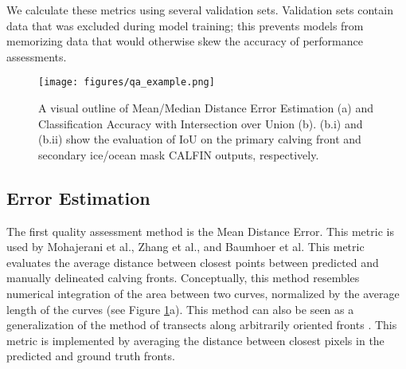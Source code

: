 \documentclass[tc, manuscript]{copernicus}
\begin{document}
We calculate these metrics using several validation sets. Validation sets contain data that was excluded during model training; this prevents models from memorizing data that would otherwise skew the accuracy of performance assessments.

\setlength{\intextsep}{4.0pt plus 2.0pt minus 2.0pt}


\begin{figure}[h]
    \texttt{[image: figures/qa\_example.png]}
    \centering
    \caption{A visual outline of Mean/Median Distance Error Estimation (a) and Classification Accuracy with Intersection over Union (b). (b.i) and (b.ii) show the evaluation of IoU on the primary calving front and secondary ice/ocean mask CALFIN outputs, respectively.}
    \label{fig:error_analysis}
\end{figure}

\subsection{Error Estimation}
\label{sec:error_estimation}
The first quality assessment method is the Mean Distance Error. This metric is used by Mohajerani et al., Zhang et al., and Baumhoer et al. This metric evaluates the average distance between closest points between predicted and manually delineated calving fronts. Conceptually, this method resembles numerical integration of the area between two curves, normalized by the average length of the curves (see Figure \ref{fig:error_analysis}a). This method can also be seen as a generalization of the method of transects along arbitrarily oriented fronts \citep{mohajerani2019, baumhoer2019}. This metric is implemented by averaging the distance between closest pixels in the predicted and ground truth fronts.

\setlength{\intextsep}{12.0pt plus 2.0pt minus 2.0pt}
\end{document}
